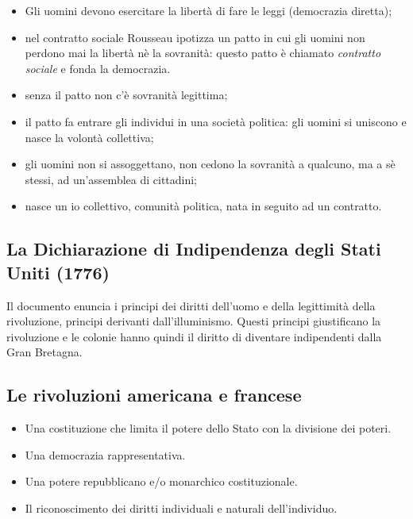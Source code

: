 \documentclass[a4paper]{article}
\begin{document}
\begin{itemize}
    \item Gli uomini devono esercitare la libertà di fare le leggi (democrazia diretta);
    \item nel contratto sociale Rousseau ipotizza un patto in cui gli uomini non perdono mai la libertà nè la sovranità: questo patto è chiamato \textit{contratto sociale} e fonda la democrazia.
    \item senza il patto non c'è sovranità legittima;
    \item il patto fa entrare gli individui in una società politica: gli uomini si uniscono e nasce la volontà collettiva;
    \item gli uomini non si assoggettano, non cedono la sovranità a qualcuno, ma a sè stessi, ad un'assemblea di cittadini;
    \item nasce un io collettivo, comunità politica, nata in seguito ad un contratto.
\end{itemize}

\subsection{La Dichiarazione di Indipendenza degli Stati Uniti (1776)}

Il documento enuncia i principi dei diritti dell'uomo e della legittimità della rivoluzione,
principi derivanti dall'illuminismo.
Questi principi giustificano la rivoluzione e le colonie hanno quindi il diritto di
diventare indipendenti dalla Gran Bretagna.


\subsection{Le rivoluzioni americana e francese}

\begin{itemize}
    \item Una costituzione che limita il potere dello Stato con la divisione dei poteri.
    \item Una democrazia rappresentativa.
    \item Una potere repubblicano e/o monarchico costituzionale.
    \item Il riconoscimento dei diritti individuali e naturali dell'individuo.
\end{itemize}
\end{document}
